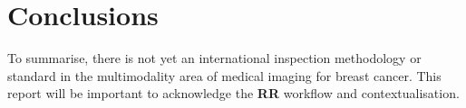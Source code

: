 
\section*{Conclusions}

To summarise, there is not yet an international inspection methodology or standard in the multimodality area of medical imaging for breast cancer. This report will be important to acknowledge the \textbf{RR} workflow and contextualisation.